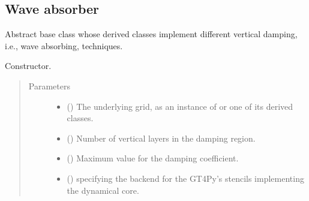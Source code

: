 \documentclass[letterpaper,10pt,english]{sphinxmanual}
\begin{document}
\subsection{Wave absorber}
\label{\detokenize{api:wave-absorber}}

\begin{fulllineitems}
\label{\detokenize{api:dycore.vertical_damping.VerticalDamping}}
Abstract base class whose derived classes implement different vertical damping, i.e., wave absorbing, techniques.

\begin{fulllineitems}
\label{\detokenize{api:dycore.vertical_damping.VerticalDamping.__init__}}
Constructor.
\begin{quote}\begin{description}
\item[{Parameters}] \leavevmode\begin{itemize}
\item {} 
 () \textendash{} The underlying grid, as an instance of {\hyperref[\detokenize{api:grids.grid_xyz.GridXYZ}]{}} or one of its derived classes.

\item {} 
 () \textendash{} Number of vertical layers in the damping region.

\item {} 
 () \textendash{} Maximum value for the damping coefficient.

\item {} 
 () \textendash{}  specifying the backend for the GT4Py’s stencils implementing the dynamical core.

\end{itemize}

\end{description}\end{quote}


\end{fulllineitems}
\end{fulllineitems}
\end{document}
